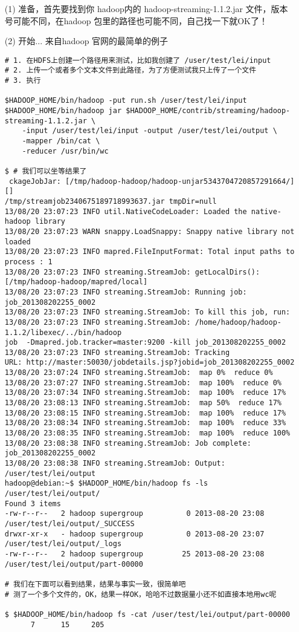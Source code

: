 \documentclass{article}
\begin{document}
\begin{itemize}
\item[(1)] 准备，首先要找到你 hadoop内的 hadoop-streaming-1.1.2.jar 文件，版本号可能不同，在hadoop
包里的路径也可能不同，自己找一下就OK了！
\item[(2)] 开始... 来自hadoop 官网的最简单的例子

\begin{verbatim}
# 1. 在HDFS上创建一个路径用来测试，比如我创建了 /user/test/lei/input
# 2. 上传一个或者多个文本文件到此路径，为了方便测试我只上传了一个文件
# 3. 执行

$HADOOP_HOME/bin/hadoop -put run.sh /user/test/lei/input
$HADOOP_HOME/bin/hadoop jar $HADOOP_HOME/contrib/streaming/hadoop-streaming-1.1.2.jar \
	-input /user/test/lei/input -output /user/test/lei/output \
	-mapper /bin/cat \
	-reducer /usr/bin/wc

$ # 我们可以坐等结果了
 ckageJobJar: [/tmp/hadoop-hadoop/hadoop-unjar5343704720857291664/] [] 
/tmp/streamjob2340675189718993637.jar tmpDir=null
13/08/20 23:07:23 INFO util.NativeCodeLoader: Loaded the native-hadoop library
13/08/20 23:07:23 WARN snappy.LoadSnappy: Snappy native library not loaded
13/08/20 23:07:23 INFO mapred.FileInputFormat: Total input paths to process : 1
13/08/20 23:07:23 INFO streaming.StreamJob: getLocalDirs(): [/tmp/hadoop-hadoop/mapred/local]
13/08/20 23:07:23 INFO streaming.StreamJob: Running job: job_201308202255_0002
13/08/20 23:07:23 INFO streaming.StreamJob: To kill this job, run:
13/08/20 23:07:23 INFO streaming.StreamJob: /home/hadoop/hadoop-1.1.2/libexec/../bin/hadoop 
job  -Dmapred.job.tracker=master:9200 -kill job_201308202255_0002
13/08/20 23:07:23 INFO streaming.StreamJob: Tracking 
URL: http://master:50030/jobdetails.jsp?jobid=job_201308202255_0002
13/08/20 23:07:24 INFO streaming.StreamJob:  map 0%  reduce 0%
13/08/20 23:07:27 INFO streaming.StreamJob:  map 100%  reduce 0%
13/08/20 23:07:34 INFO streaming.StreamJob:  map 100%  reduce 17%
13/08/20 23:08:13 INFO streaming.StreamJob:  map 50%  reduce 17%
13/08/20 23:08:15 INFO streaming.StreamJob:  map 100%  reduce 17%
13/08/20 23:08:34 INFO streaming.StreamJob:  map 100%  reduce 33%
13/08/20 23:08:35 INFO streaming.StreamJob:  map 100%  reduce 100%
13/08/20 23:08:38 INFO streaming.StreamJob: Job complete: job_201308202255_0002
13/08/20 23:08:38 INFO streaming.StreamJob: Output: /user/test/lei/output
hadoop@debian:~$ $HADOOP_HOME/bin/hadoop fs -ls /user/test/lei/output/
Found 3 items
-rw-r--r--   2 hadoop supergroup          0 2013-08-20 23:08 /user/test/lei/output/_SUCCESS
drwxr-xr-x   - hadoop supergroup          0 2013-08-20 23:07 /user/test/lei/output/_logs
-rw-r--r--   2 hadoop supergroup         25 2013-08-20 23:08 /user/test/lei/output/part-00000

# 我们在下面可以看到结果，结果与事实一致，很简单吧
# 测了一个多个文件的，OK，结果一样OK，哈哈不过数据量小还不如直接本地用wc呢

$ $HADOOP_HOME/bin/hadoop fs -cat /user/test/lei/output/part-00000
      7      15     205	
\end{verbatim}
\end{itemize}
\end{document}
